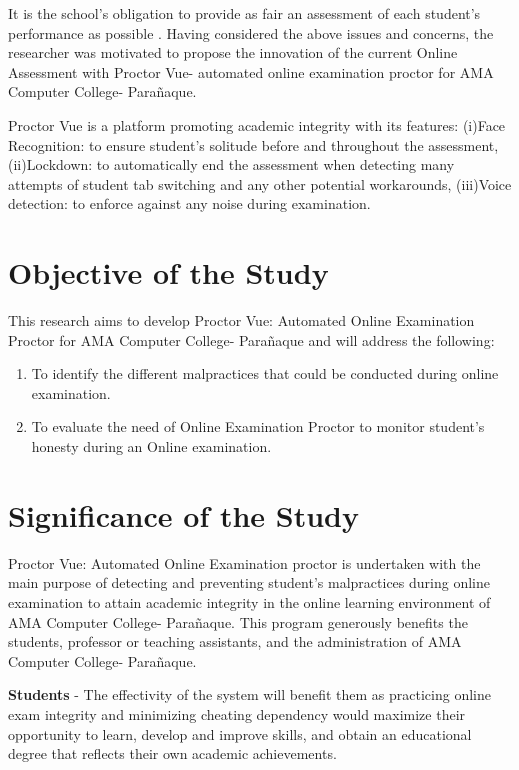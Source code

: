 It is the school’s obligation to provide as fair an assessment of each student’s performance as possible \cite{lundahl2010skolbedomningens}.
Having considered the above issues and concerns, the researcher was motivated to propose the innovation of the current Online Assessment with Proctor Vue- automated online examination proctor for AMA Computer College- Parañaque.

Proctor Vue is a platform promoting academic integrity with its features: (i)Face Recognition: to ensure student’s solitude before and throughout the assessment, (ii)Lockdown: to automatically end the assessment when detecting many attempts of student tab switching and any other potential workarounds, (iii)Voice detection: to enforce against any noise during examination.

\section{Objective of the Study}
This research aims to develop Proctor Vue: Automated Online Examination Proctor for AMA Computer College- Parañaque and will address the following:
\begin{enumerate}
    \item To identify the different malpractices that could be conducted during online examination.
    \item To evaluate the need of Online Examination Proctor to monitor student's honesty during an Online examination.
\end{enumerate}

\section{Significance of the Study}

Proctor Vue: Automated Online Examination proctor is undertaken with the main purpose of detecting and preventing student’s malpractices during online examination to attain academic integrity in the online learning environment of AMA Computer College- Parañaque. This program generously benefits the students, professor or teaching assistants, and the administration of AMA Computer College- Parañaque.

\textbf{Students} - The effectivity of the system will benefit them as practicing online exam integrity and minimizing cheating dependency would maximize their opportunity to learn, develop and improve skills, and obtain an educational degree that reflects their own academic achievements.

